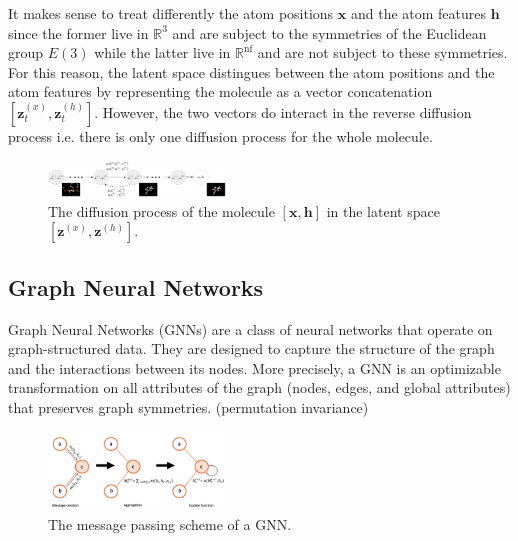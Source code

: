 \documentclass[sigconf]{acmart}
\begin{document}
It makes sense to treat differently the atom positions $\mathbf{x}$ and the atom features $\mathbf{h}$ since the former live in $\mathbb{R}^3$ and are subject to the symmetries of the Euclidean group $E(3)$ while the latter live in $\mathbb{R}^\text{nf}$ and are not subject to these symmetries.
For this reason, the latent space distingues between the atom positions and the atom features by representing the molecule as a vector concatenation $\left[ \mathbf{z}^{(x)}_t, \mathbf{z}^{(h)}_t \right]$.
However, the two vectors do interact in the reverse diffusion process i.e. there is only one diffusion process for the whole molecule.

\begin{figure}
    \centering
    \includegraphics[width=0.42\textwidth]{figures/diffusion.png}
    \caption{The diffusion process of the molecule $\left[ \mathbf{x}, \mathbf{h} \right]$ in the latent space $\left[ \mathbf{z}^{(x)}, \mathbf{z}^{(h)} \right]$.}
    \label{fig:diffusion}
\end{figure}

\subsection{Graph Neural Networks}
Graph Neural Networks (GNNs) are a class of neural networks that operate on graph-structured data.
They are designed to capture the structure of the graph and the interactions between its nodes.
More precisely, a GNN is an optimizable transformation on all attributes of the graph (nodes, edges, and global attributes) 
that preserves graph symmetries. (permutation invariance) \cite{gentle-intro-GNN}

\begin{figure}
    \centering
    \includegraphics[width=0.42\textwidth]{figures/message_passing.png}
    \caption{The message passing scheme of a GNN.}
    \label{fig:message-passing}
\end{figure}
\end{document}
